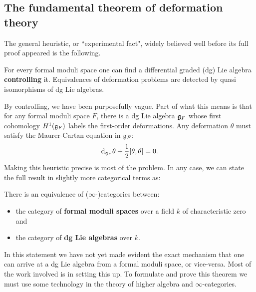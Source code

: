 \documentclass[11pt]{amsart}
\begin{document}
\subsection{The fundamental theorem of deformation theory}

The general heuristic, or ``experimental fact", widely believed well before its full proof appeared is the following. 

\begin{ef}
For every formal moduli space one can find a differential graded (dg) Lie algebra {\bf controlling} it. 
Equivalences of deformation problems are detected by quasi isomorphisms of dg Lie algebras.
\end{ef}

By controlling, we have been purposefully vague.
Part of what this means is that for any formal moduli space $F$, there is a dg Lie algebra $\mathfrak g_{F}$ whose first cohomology $H^1(\mathfrak g_F)$ labels the first-order deformations. 
Any deformation $\theta$ must satisfy the Maurer-Cartan equation in $\mathfrak g_{F}$:
\[
{\rm d}_{\mathfrak g_{F}} \theta + \frac{1}{2} [\theta,\theta] = 0 .
\] 
Making this heuristic precise is most of the problem. 
In any case, we can state the full result in slightly more categorical terms as:

\begin{thm}
There is an equivalence of ($\infty$-)categories between:
\begin{itemize}
\item the category of {\bf formal moduli spaces} over a field $k$ of characteristic zero and
\item the category of {\bf dg Lie algebras} over $k$. 
\end{itemize}
\end{thm} 

In this statement we have not yet made evident the exact mechanism that one can arrive at a dg Lie algebra from a formal moduli space, or vice-versa. 
Most of the work involved is in setting this up.
To formulate and prove this theorem we must use some technology in the theory of higher algebra and $\infty$-categories. 
\end{document}
